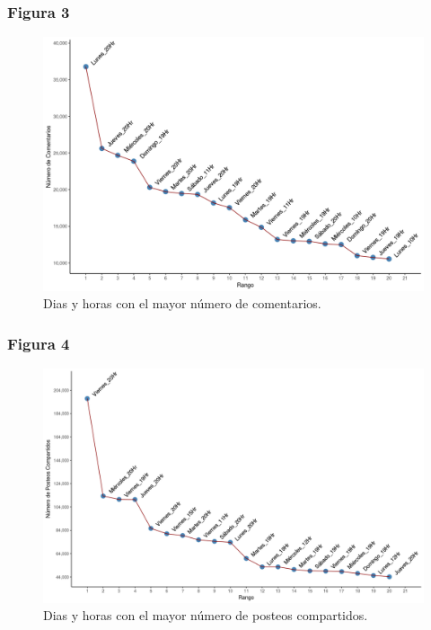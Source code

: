 \documentclass[a4paper,10pt]{article}
\begin{document}
\subsubsection{Figura 3}
\begin{figure}[H]
  \begin{center}
   \includegraphics[width=.85\textwidth]{imagenes/figura3.png}
   \captionsetup{width=.80\textwidth}
   \caption{\centering Dias y horas con el mayor número de comentarios.} 
   \end{center} 
\end{figure}

\subsubsection{Figura 4}
\begin{figure}[H]
  \begin{center}
    \includegraphics[width=.85\textwidth]{imagenes/figura4.png}
    \captionsetup{width=.80\textwidth}
    \caption{\centering Dias y horas con el mayor número de posteos compartidos.}   
   \end{center} 
\end{figure}
\end{document}

